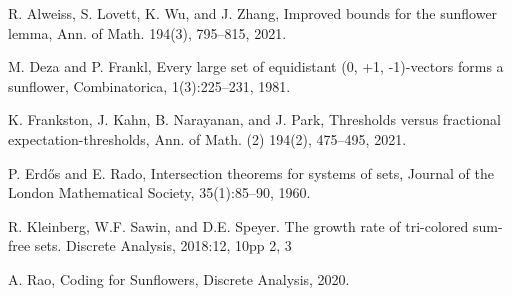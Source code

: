 \documentclass[12pt]{article}
\begin{document}
\begin{thebibliography}{99}

R. Alweiss, S. Lovett, K. Wu, and J. Zhang, Improved bounds for the sunflower lemma, Ann. of Math. 194(3), 795--815, 2021.

M. Deza and P. Frankl, Every large set of equidistant (0, +1, -1)-vectors forms a sunflower, Combinatorica, 1(3):225--231, 1981.

K. Frankston, J. Kahn, B. Narayanan, and J. Park, Thresholds versus fractional expectation-thresholds, Ann. of Math. (2) 194(2), 475--495, 2021.

P. Erd\H{o}s and E. Rado, Intersection theorems for systems of sets, Journal of the London Mathematical Society, 35(1):85–90, 1960.

\iffalse

\bibitem{ff2} P. Frankl and Z. Furedi: Exact solution of some Tur\'an-type problems, Journal of Combinatorial Theory, Ser. A 45 (1987), 226--262.  
 

\bibitem{ff1}
P. Frankl and Z. Furedi: Forbidding just one intersection, Journal of Combinatorial Theory, Ser. A 39 (1985), 160--176.

\fi

R. Kleinberg, W.F. Sawin, and D.E. Speyer. The growth rate of tri-colored sum-free
sets. Discrete Analysis, 2018:12, 10pp 2, 3

A. Rao, Coding for Sunflowers, Discrete Analysis, 2020.

\iffalse

\bibitem{fursun}
A. Furedi: On finite set-systems whose every intersection is a kernel of a star, Discrete Mathematics 47 (1983), 129--132. 

\fi

\end{thebibliography}


		
\end{document}
